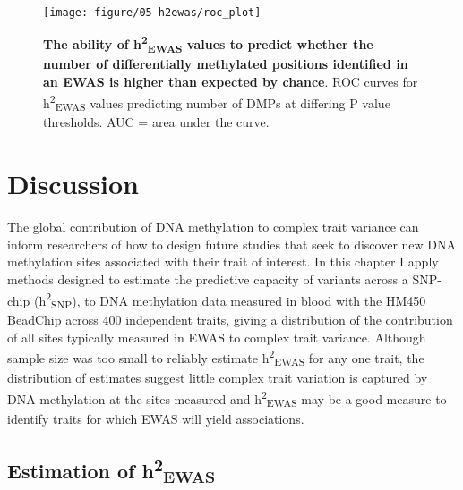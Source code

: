 \documentclass[11pt,oneside]{bristolthesis}
\begin{document}
\begin{figure}

{\centering \texttt{[image: figure/05-h2ewas/roc\_plot]} 

}

\caption[The ability of h\textsuperscript{2}\textsubscript{EWAS} values to predict whether the number of differentially methylated positions identified in an EWAS is higher than expected by chance]{\textbf{The ability of h\textsuperscript{2}\textsubscript{EWAS} values to predict whether the number of differentially methylated positions identified in an EWAS is higher than expected by chance}. ROC curves for h\textsuperscript{2}\textsubscript{EWAS} values predicting number of DMPs at differing P value thresholds. AUC = area under the curve.}\label{fig:h2ewas-dmp-roc-curve}
\end{figure}
\hypertarget{discussion-05}{%
\section{Discussion}\label{discussion-05}}

The global contribution of DNA methylation to complex trait variance can inform researchers of how to design future studies that seek to discover new DNA methylation sites associated with their trait of interest. In this chapter I apply methods designed to estimate the predictive capacity of variants across a SNP-chip (h\textsuperscript{2}\textsubscript{SNP}), to DNA methylation data measured in blood with the HM450 BeadChip across 400 independent traits, giving a distribution of the contribution of all sites typically measured in EWAS to complex trait variance. Although sample size was too small to reliably estimate h\textsuperscript{2}\textsubscript{EWAS} for any one trait, the distribution of estimates suggest little complex trait variation is captured by DNA methylation at the sites measured and h\textsuperscript{2}\textsubscript{EWAS} may be a good measure to identify traits for which EWAS will yield associations.

\hypertarget{estimation-of-h2ewas}{%
\subsection{\texorpdfstring{Estimation of h\textsuperscript{2}\textsubscript{EWAS}}{Estimation of h2EWAS}}\label{estimation-of-h2ewas}}
\end{document}
